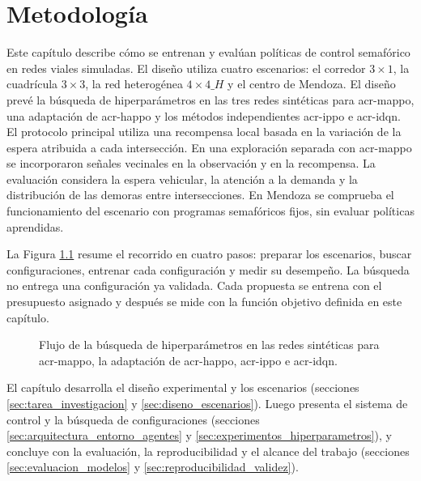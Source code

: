 
\chapter{Metodología}
\label{capitulo:metodologia}

Este capítulo describe cómo se entrenan y evalúan políticas de control semafórico en redes viales simuladas. El diseño utiliza cuatro escenarios: el corredor $3\times1$, la cuadrícula $3\times3$, la red heterogénea $4\times4\_H$ y el centro de Mendoza. El diseño prevé la búsqueda de hiperparámetros en las tres redes sintéticas para \acrshort{acr-mappo}, una adaptación de \acrshort{acr-happo} y los métodos independientes \acrshort{acr-ippo} e \acrshort{acr-idqn}. El protocolo principal utiliza una recompensa local basada en la variación de la espera atribuida a cada intersección. En una exploración separada con \acrshort{acr-mappo} se incorporaron señales vecinales en la observación y en la recompensa. La evaluación considera la espera vehicular, la atención a la demanda y la distribución de las demoras entre intersecciones. En Mendoza se comprueba el funcionamiento del escenario con programas semafóricos fijos, sin evaluar políticas aprendidas.

La Figura \ref{fig:flujo_metodologico_general} resume el recorrido en cuatro pasos: preparar los escenarios, buscar configuraciones, entrenar cada configuración y medir su desempeño. La búsqueda no entrega una configuración ya validada. Cada propuesta se entrena con el presupuesto asignado y después se mide con la función objetivo definida en este capítulo.

\begin{figure}[H]
\centering

\caption[Flujo de la búsqueda de hiperparámetros en las redes sintéticas.]{Flujo de la búsqueda de hiperparámetros en las redes sintéticas para \acrshort{acr-mappo}, la adaptación de \acrshort{acr-happo}, \acrshort{acr-ippo} e \acrshort{acr-idqn}.}
\label{fig:flujo_metodologico_general}
\end{figure}

El capítulo desarrolla el diseño experimental y los escenarios (secciones \ref{sec:tarea_investigacion} y \ref{sec:diseno_escenarios}). Luego presenta el sistema de control y la búsqueda de configuraciones (secciones \ref{sec:arquitectura_entorno_agentes} y \ref{sec:experimentos_hiperparametros}), y concluye con la evaluación, la reproducibilidad y el alcance del trabajo (secciones \ref{sec:evaluacion_modelos} y \ref{sec:reproducibilidad_validez}).

